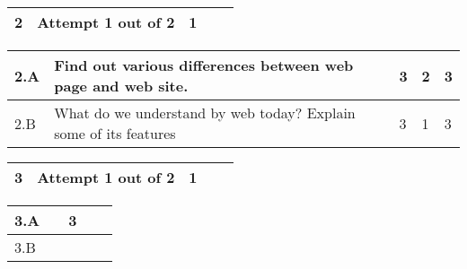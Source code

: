 \documentclass[12pt]{article}
\begin{document}
	
	


	
	
		\begin{tabular}{L{1cm}L{8cm}C{2cm}C{2cm}C{1cm}}
		\bf2 & Attempt 1 out of 2 & 1 & & \\ \hline
	\end{tabular}

	
	
	\begin{tabular}{|L{1cm}|L{8cm}|C{2cm}|C{2cm}|C{1cm}|}
				2.A &
	Find out various differences between web page and web site. \newline
		 &  3 & 2 & 3\\ \hline
		2.B &
	What do we understand by web today? Explain some of its features \newline
		 &  3 & 1 & 3\\ \hline
		\end{tabular}

	
	


	
	
		\begin{tabular}{L{1cm}L{8cm}C{2cm}C{2cm}C{1cm}}
		\bf3 & Attempt 1 out of 2 & 1 & & \\ \hline
	\end{tabular}

	
	
	\begin{tabular}{|L{1cm}|L{8cm}|C{2cm}|C{2cm}|C{1cm}|}
				3.A &
	 \newline
		 &  3 &  & \\ \hline
		3.B &
	 \newline
		 &   &  & \\ \hline
		\end{tabular}

	
	


	
	
		
	
\end{document}
